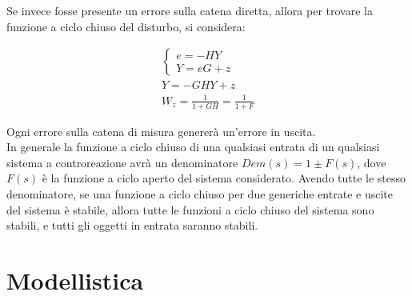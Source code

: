 \documentclass{article}
\numberwithin{equation}{subsection}
\begin{document}
Se invece fosse presente un errore sulla catena diretta, allora per trovare la funzione a ciclo chiuso del disturbo, si considera:

\begin{gather}
    \begin{cases}
        e=-HY\\
        Y=eG+z
    \end{cases}\\
    Y=-GHY+z\\
    W_z=\displaystyle\frac{1}{1+GH}=\frac{1}{1+F}
\end{gather}

\begin{center}\end{center}

Ogni errore sulla catena di misura genererà un'errore in uscita.\\

In generale la funzione a ciclo chiuso di una qualsiasi entrata di un qualsiasi sistema a controreazione avrà un denominatore $Dem(s)=1\pm F(s)$, dove $F(s)$ è la funzione a 
ciclo aperto del sistema considerato. Avendo tutte le stesso denominatore, 
se una funzione a ciclo chiuso per due generiche entrate e uscite del sistema è stabile, allora tutte le funzioni a ciclo chiuso del sistema sono 
stabili, e tutti gli oggetti in entrata saranno stabili.  

\clearpage

\section{Modellistica}
\end{document}
